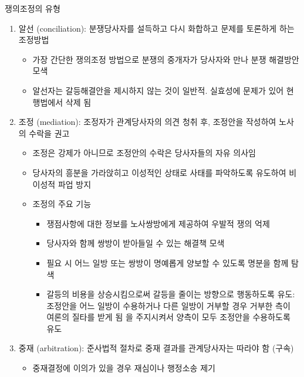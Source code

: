 \documentclass[aspectratio=169,xcolor=dvipsnames,handout]{beamer}
\begin{document}
\begin{frame}[allowframebreaks]{쟁의조정의 유형}
    \begin{enumerate}[<+->]
        \item 알선 (conciliation): 분쟁당사자를 설득하고 다시 화합하고 문제를 토론하게 하는 조정방법
        \begin{itemize}[<+->]
            \item 가장 간단한 쟁의조정 방법으로 분쟁의 중개자가 당사자와 만나 분쟁 해결방안 모색
            \item 알선자는 갈등해결안을 제시하지 않는 것이 일반적. 실효성에 문제가 있어 현행법에서 삭제 됨
        \end{itemize}
        \item 조정 (mediation): 조정자가 관계당사자의 의견 청취 후, 조정안을 작성하여 노사의 수락을 권고
        \begin{itemize}[<+->]
            \item 조정은 강제가 아니므로 조정안의 수락은 당사자들의 자유 의사임 
            \item 당사자의 흥분을 가라앉히고 이성적인 상태로 사태를 파악하도록 유도하여 비이성적 파업 방지
        \framebreak\relax
            \item 조정의 주요 기능
            \begin{itemize}[<+->]
                \item 쟁점사항에 대한 정보를 노사쌍방에게 제공하여 우발적 쟁의 억제 
                \item 당사자와 함께 쌍방이 받아들일 수 있는 해결책 모색
                \item 필요 시 어느 일방 또는 쌍방이 명예롭게 양보할 수 있도록 명분을 함께 탐색
                \item 갈등의 비용을 상승시킴으로써 갈등을 줄이는 방향으로 행동하도록 유도: 조정안을 어느 일방이 수용하거나 다른 일방이 거부할 경우 거부한 측이 여론의 질타를 받게 됨 을 주지시켜서 양측이 모두 조정안을 수용하도록 유도
            \end{itemize}
        \end{itemize}
        \item 중재 (arbitration): 준사법적 절차로 중재 결과를 관계당사자는 따라야 함 (구속)
        \begin{itemize}[<+->]
            \item 중재결정에 이의가 있을 경우 재심이나 행정소송 제기
        \end{itemize}
    \end{enumerate}
\end{frame}
\end{document}
